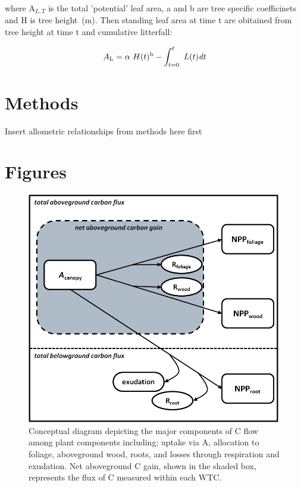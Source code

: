 \documentclass[a4paper]{article}
\begin{document}
where $\text{A}_{L,T}$ is the total 'potential' leaf area, a and b are tree specific coefficinets and H is tree height~(m). Then standing leaf area at time t are obitained from tree height at time t and cumulative litterfall:

\begin{equation}  A\textsubscript{L} = \alpha~H(t)\textsuperscript{b} - \int_{t=0}^t~L(t)\textit{dt}
\label{eq:leafarea2}
\end{equation}

\section*{Methods}

Insert allometric relationships from methods here first

\clearpage
\section*{Figures}

\begin{figure}[h!]
    \centering
    \includegraphics[width=0.99\textwidth]{wtc_concept.png}
    \caption{Conceptual diagram depicting the major components of C flow among plant components including; uptake via A, allocation to foliage, aboveground wood, roots, and losses through respiration and exudation.  Net aboveground C gain, shown in the shaded box, represents the flux of C measured within each WTC. }
    \label{fig:figure1}
\end{figure}
\end{document}
